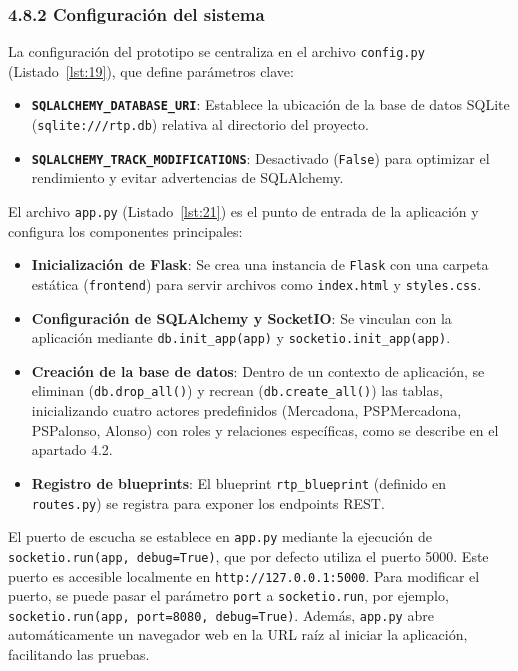 \subsubsection*{4.8.2 \; Configuración del sistema}

La configuración del prototipo se centraliza en el archivo \texttt{config.py} (Listado~\ref{lst:19}), que define parámetros clave:

\begin{itemize}
    \item \textbf{\texttt{SQLALCHEMY\_DATABASE\_URI}}: Establece la ubicación de la base de datos SQLite (\texttt{sqlite:///rtp.db}) relativa al directorio del proyecto.
    \item \textbf{\texttt{SQLALCHEMY\_TRACK\_MODIFICATIONS}}: Desactivado (\texttt{False}) para optimizar el rendimiento y evitar advertencias de SQLAlchemy.
\end{itemize}

El archivo \texttt{app.py} (Listado~\ref{lst:21}) es el punto de entrada de la aplicación y configura los componentes principales:

\begin{itemize}
    \item \textbf{Inicialización de Flask}: Se crea una instancia de \texttt{Flask} con una carpeta estática (\texttt{frontend}) para servir archivos como \texttt{index.html} y \texttt{styles.css}.
    \item \textbf{Configuración de SQLAlchemy y SocketIO}: Se vinculan con la aplicación mediante \texttt{db.init\_app(app)} y \texttt{socketio.init\_app(app)}.
    \item \textbf{Creación de la base de datos}: Dentro de un contexto de aplicación, se eliminan (\texttt{db.drop\_all()}) y recrean (\texttt{db.create\_all()}) las tablas, inicializando cuatro actores predefinidos (Mercadona, PSPMercadona, PSPalonso, Alonso) con roles y relaciones específicas, como se describe en el apartado 4.2.
    \item \textbf{Registro de blueprints}: El blueprint \texttt{rtp\_blueprint} (definido en \texttt{routes.py}) se registra para exponer los endpoints REST.
\end{itemize}

El puerto de escucha se establece en \texttt{app.py} mediante la ejecución de \texttt{socketio.run(app, debug=True)}, que por defecto utiliza el puerto 5000. Este puerto es accesible localmente en \texttt{http://127.0.0.1:5000}. Para modificar el puerto, se puede pasar el parámetro \texttt{port} a \texttt{socketio.run}, por ejemplo, \texttt{socketio.run(app, port=8080, debug=True)}. Además, \texttt{app.py} abre automáticamente un navegador web en la URL raíz al iniciar la aplicación, facilitando las pruebas.

